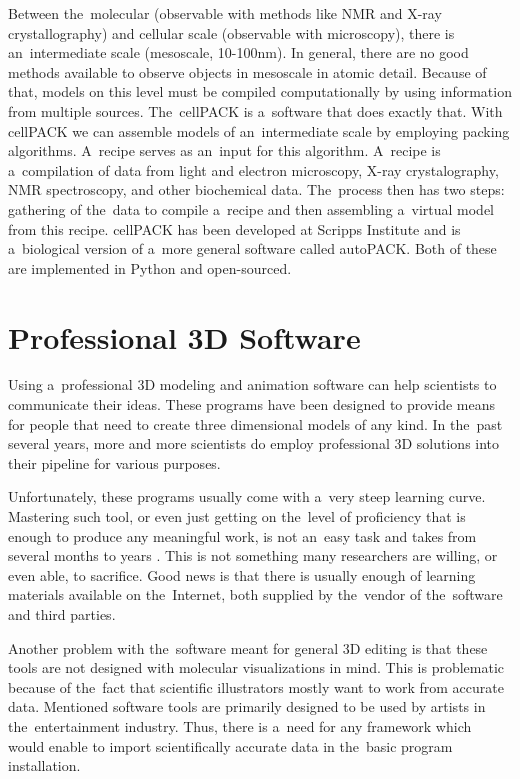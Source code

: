 \documentclass[
  digital, %
  table,   %
  nolof,     %
  nolot,     %
  oneside,
]{fithesis3}
\begin{document}
Between the molecular (observable with methods like NMR and X-ray crystallography) and cellular scale (observable with microscopy), there is an intermediate scale (mesoscale, 10-100nm). In general, there are no good methods available to observe objects in mesoscale in atomic detail. Because of that, models on this level must be compiled computationally by using information from multiple sources. The cellPACK \cite{cellPACK} is a software that does exactly that. With cellPACK we can assemble models of an intermediate scale by employing packing algorithms. A recipe serves as an input for this algorithm. A recipe is a compilation of data from light and electron microscopy, X-ray crystalography, NMR spectroscopy, and other biochemical data. The process then has two steps: gathering of the data to compile a recipe and then assembling a virtual model from this recipe. cellPACK has been developed at Scripps Institute and is a biological version of a more general software called autoPACK. Both of these are implemented in Python and open-sourced.

\section{Professional 3D Software}
Using a professional 3D modeling and animation software can help scientists to communicate their ideas. These programs have been designed to provide means for people that need to create three dimensional models of any kind. In the past several years, more and more scientists do employ professional 3D solutions into their pipeline for various purposes.

Unfortunately, these programs usually come with a very steep learning curve. Mastering such tool, or even just getting on the level of proficiency that is enough to produce any meaningful work, is not an easy task and takes from several months to years \cite{scientificAnimator}. This is not something many researchers are willing, or even able, to sacrifice. Good news is that there is usually enough of learning materials available on the Internet, both supplied by the vendor of the software and third parties.

Another problem with the software meant for general 3D editing is that these tools are not designed with molecular visualizations in mind. This is problematic because of the fact that scientific illustrators mostly want to work from accurate data. Mentioned software tools are primarily designed to be used by artists in the entertainment industry. Thus, there is a need for any framework which would enable to import scientifically accurate data in the basic program installation.
\end{document}
